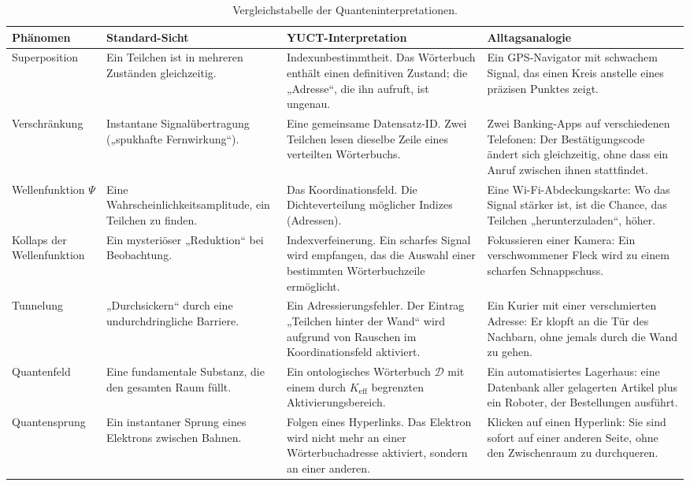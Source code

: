 \documentclass[12pt,a4paper]{article}
\theoremstyle{remark}
\begin{document}
	\begin{table}[H]
		\centering
		\caption{Vergleichstabelle der Quanteninterpretationen.}
		\label{tab:quantum-interpretations}
		\small
		\begin{tabularx}{\textwidth}{p{2.8cm} p{3.0cm} p{4.5cm} p{4.5cm}}
			\toprule
			\textbf{Phänomen} & \textbf{Standard-Sicht} & \textbf{YUCT-Interpretation} & \textbf{Alltagsanalogie} \\
			\midrule
			Superposition &
			Ein Teilchen ist in mehreren Zuständen gleichzeitig. &
			Indexunbestimmtheit. Das Wörterbuch enthält einen definitiven Zustand; die „Adresse“, die ihn aufruft, ist ungenau. &
			Ein GPS-Navigator mit schwachem Signal, das einen Kreis anstelle eines präzisen Punktes zeigt. \\
			\addlinespace
			Verschränkung &
			Instantane Signalübertragung („spukhafte Fernwirkung“). &
			Eine gemeinsame Datensatz-ID. Zwei Teilchen lesen dieselbe Zeile eines verteilten Wörterbuchs. &
			Zwei Banking-Apps auf verschiedenen Telefonen: Der Bestätigungscode ändert sich gleichzeitig, ohne dass ein Anruf zwischen ihnen stattfindet. \\
			\addlinespace
			Wellenfunktion \( \Psi \) &
			Eine Wahrscheinlichkeitsamplitude, ein Teilchen zu finden. &
			Das Koordinationsfeld. Die Dichteverteilung möglicher Indizes (Adressen). &
			Eine Wi-Fi-Abdeckungskarte: Wo das Signal stärker ist, ist die Chance, das Teilchen „herunterzuladen“, höher. \\
			\addlinespace
			Kollaps der Wellenfunktion &
			Ein mysteriöser „Reduktion“ bei Beobachtung. &
			Indexverfeinerung. Ein scharfes Signal wird empfangen, das die Auswahl einer bestimmten Wörterbuchzeile ermöglicht. &
			Fokussieren einer Kamera: Ein verschwommener Fleck wird zu einem scharfen Schnappschuss. \\
			\addlinespace
			Tunnelung &
			„Durchsickern“ durch eine undurchdringliche Barriere. &
			Ein Adressierungsfehler. Der Eintrag „Teilchen hinter der Wand“ wird aufgrund von Rauschen im Koordinationsfeld aktiviert. &
			Ein Kurier mit einer verschmierten Adresse: Er klopft an die Tür des Nachbarn, ohne jemals durch die Wand zu gehen. \\
			\addlinespace
			Quantenfeld &
			Eine fundamentale Substanz, die den gesamten Raum füllt. &
			Ein ontologisches Wörterbuch \( \mathcal{D} \) mit einem durch \( K_{\mathrm{eff}} \) begrenzten Aktivierungsbereich. &
			Ein automatisiertes Lagerhaus: eine Datenbank aller gelagerten Artikel plus ein Roboter, der Bestellungen ausführt. \\
			\addlinespace
			Quantensprung &
			Ein instantaner Sprung eines Elektrons zwischen Bahnen. &
			Folgen eines Hyperlinks. Das Elektron wird nicht mehr an einer Wörterbuchadresse aktiviert, sondern an einer anderen. &
			Klicken auf einen Hyperlink: Sie sind sofort auf einer anderen Seite, ohne den Zwischenraum zu durchqueren. \\
			\bottomrule
		\end{tabularx}
	\end{table}
	
\end{document}
